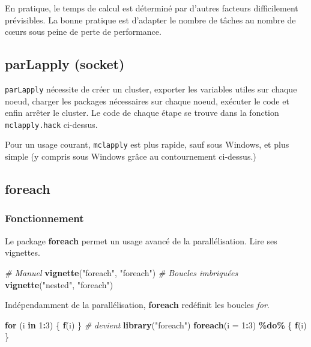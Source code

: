\documentclass[
  12pt,
  french,
  a4paper,
  extrafontsizes,onecolumn,openright
  ]{memoir}
\newenvironment{Shaded}{\begin{snugshade}}{\end{snugshade}}
\newcommand{\AttributeTok}[1]{\textcolor[rgb]{0.13,0.29,0.53}{#1}}
\newcommand{\CommentTok}[1]{\textcolor[rgb]{0.56,0.35,0.01}{\textit{#1}}}
\newcommand{\ControlFlowTok}[1]{\textcolor[rgb]{0.13,0.29,0.53}{\textbf{#1}}}
\newcommand{\DecValTok}[1]{\textcolor[rgb]{0.00,0.00,0.81}{#1}}
\newcommand{\FunctionTok}[1]{\textcolor[rgb]{0.13,0.29,0.53}{\textbf{#1}}}
\newcommand{\NormalTok}[1]{#1}
\newcommand{\SpecialCharTok}[1]{\textcolor[rgb]{0.81,0.36,0.00}{\textbf{#1}}}
\newcommand{\StringTok}[1]{\textcolor[rgb]{0.31,0.60,0.02}{#1}}
\newlength{\rf}
\begin{document}
En pratique, le temps de calcul est déterminé par d'autres facteurs difficilement prévisibles.
La bonne pratique est d'adapter le nombre de tâches au nombre de cœurs sous peine de perte de performance.

\subsection{parLapply (socket)}\label{parlapply-socket}

\texttt{parLapply} nécessite de créer un cluster, exporter les variables utiles sur chaque noeud, charger les packages nécessaires sur chaque noeud, exécuter le code et enfin arrêter le cluster.
Le code de chaque étape se trouve dans la fonction \texttt{mclapply.hack} ci-dessus.

Pour un usage courant, \texttt{mclapply} est plus rapide, sauf sous Windows, et plus simple (y compris sous Windows grâce au contournement ci-dessus.)

\subsection{foreach}\label{foreach}

\subsubsection{Fonctionnement}\label{fonctionnement}

Le package \textbf{foreach} permet un usage avancé de la parallélisation.
Lire ses vignettes.

\scriptsize

\begin{Shaded}
\begin{Highlighting}[]
\CommentTok{\# Manuel}
\FunctionTok{vignette}\NormalTok{(}\StringTok{"foreach"}\NormalTok{, }\StringTok{"foreach"}\NormalTok{)}
\CommentTok{\# Boucles imbriquées}
\FunctionTok{vignette}\NormalTok{(}\StringTok{"nested"}\NormalTok{, }\StringTok{"foreach"}\NormalTok{)}
\end{Highlighting}
\end{Shaded}

\normalsize

Indépendamment de la parallélisation, \textbf{foreach} redéfinit les boucles \emph{for}.

\scriptsize

\begin{Shaded}
\begin{Highlighting}[]
\ControlFlowTok{for}\NormalTok{ (i }\ControlFlowTok{in} \DecValTok{1}\SpecialCharTok{:}\DecValTok{3}\NormalTok{) \{}
  \FunctionTok{f}\NormalTok{(i)}
\NormalTok{\}}
\CommentTok{\# devient}
\FunctionTok{library}\NormalTok{(}\StringTok{"foreach"}\NormalTok{)}
\FunctionTok{foreach}\NormalTok{(}\AttributeTok{i =} \DecValTok{1}\SpecialCharTok{:}\DecValTok{3}\NormalTok{) }\SpecialCharTok{\%do\%}\NormalTok{ \{}
  \FunctionTok{f}\NormalTok{(i)}
\NormalTok{\}}
\end{Highlighting}
\end{Shaded}
\end{document}
